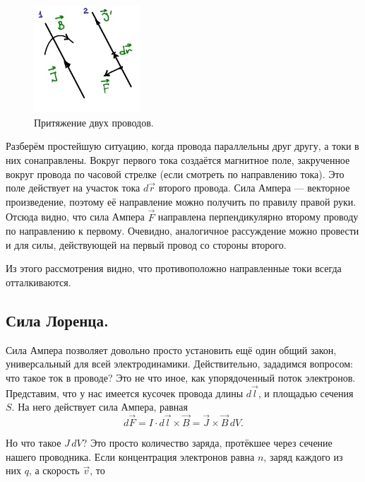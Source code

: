 \documentclass[11pt,a4paper]{article}
\numberwithin{equation}{section}
\begin{document}
\begin{figure}
  \vspace{-1cm}
  \begin{center}
  \includegraphics[width=4cm]{2wires.pdf}  
  \end{center}
  \vspace{-1cm}
  \caption{Притяжение двух проводов.}
  \label{fig:2wires}
\end{figure}

Разберём простейшую ситуацию, когда провода параллельны друг другу, а
токи в них сонаправлены. Вокруг первого тока создаётся магнитное поле,
закрученное вокруг провода по часовой стрелке (если смотреть по
направлению тока). Это поле действует на участок тока $d\vec{r}$
второго провода. Сила Ампера --- векторное произведение, поэтому её
направление можно получить по правилу правой руки. Отсюда видно, что
сила Ампера $\vec{F}$ направлена перпендикулярно второму проводу по
направлению к первому. Очевидно, аналогичное рассуждение можно
провести и для силы, действующей на первый провод со стороны второго.

Из этого рассмотрения видно, что противоположно направленные токи
всегда отталкиваются. 

\subsection{Сила Лоренца.}
\label{sec:lorentz_force}

Сила Ампера позволяет довольно просто установить ещё один общий закон,
универсальный для всей электродинамики. Действительно, зададимся
вопросом: что такое ток в проводе? Это не что иное, как упорядоченный
поток электронов. Представим, что у нас имеется кусочек провода длины
$d\vec{l}$, и площадью сечения $S$. На него действует сила Ампера,
равная
\begin{equation}
  \label{eq:der_lorentz_force_1}
  d\vec{F} = I \cdot d\vec{l} \times \vec{B} = \vec{J} \times \vec{B}\, dV.
\end{equation}

Но что такое $J \, dV$? Это просто количество заряда, протёкшее через
сечение нашего проводника. Если концентрация электронов равна $n$, заряд
каждого из них $q$, а скорость $\vec{v}$, то 
\end{document}
